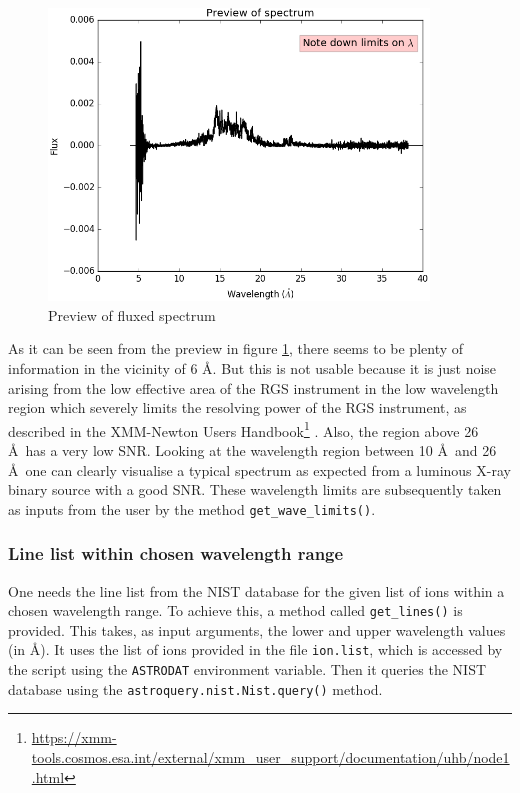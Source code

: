                 \begin{figure}[h!]
    				\centering
    				\includegraphics[width=0.9\textwidth]{images/mrvel_preview}
    				\caption{Preview of fluxed spectrum}
    				\label{fig:spec-preview}
			    \end{figure}
			    
			    As it can be seen from the preview in figure \ref{fig:spec-preview}, there seems to be plenty of information in the vicinity of 6 \AA. But this is not usable because it is just noise arising from the low effective area of the RGS instrument in the low wavelength region which severely limits the resolving power of the RGS instrument, as described in the XMM-Newton Users Handbook\footnote{\url{https://xmm-tools.cosmos.esa.int/external/xmm_user_support/documentation/uhb/node1.html}} \cite{ehle2003xmm}. Also, the region above 26 \AA~has a very low SNR. Looking at the wavelength region between 10 \AA~and 26 \AA~one can clearly visualise a typical spectrum as expected from a luminous X-ray binary source with a good SNR. These wavelength limits are subsequently taken as inputs from the user by the method \texttt{get\_wave\_limits()}.
			 
            \subsubsection{Line list within chosen wavelength range} \label{tool:rgs-files:demonstration:linelist}
                One needs the line list from the NIST database for the given list of ions within a chosen wavelength range. To achieve this, a method called \texttt{get\_lines()} is provided. This takes, as input arguments, the lower and upper wavelength values (in \AA). It uses the list of ions provided in the file \texttt{ion.list}, which is accessed by the script using the \texttt{ASTRODAT} environment variable. Then it queries the NIST database using the \texttt{astroquery.nist.Nist.query()} method.
                
